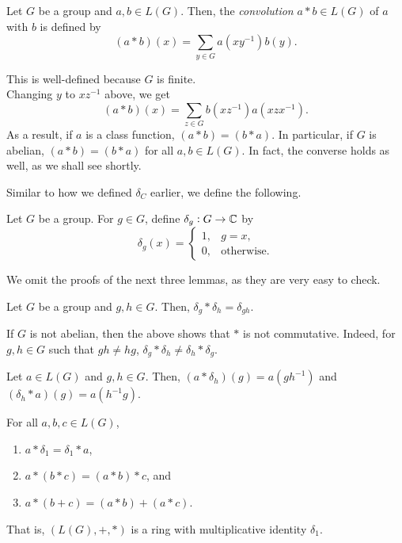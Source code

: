 		\begin{fdef}[Convolution]
			Let $G$ be a group and $a,b \in L(G)$. Then, the \emph{convolution} $a*b \in L(G)$ of $a$ with $b$ is defined by
			\[ (a*b)(x) = \sum_{y \in G} a(xy^{-1}) b(y). \]
		\end{fdef}

		This is well-defined because $G$ is finite.\\

		Changing $y$ to $xz^{-1}$ above, we get
		\[ (a*b)(x) = \sum_{z \in G} b(xz^{-1})a(xzx^{-1}). \]
		As a result, if $a$ is a class function, $(a*b) = (b*a)$. In particular, if $G$ is abelian, $(a*b) = (b*a)$ for all $a,b \in L(G)$. In fact, the converse holds as well, as we shall see shortly.

		Similar to how we defined $\delta_C$ earlier, we define the following.

		\begin{definition}
			Let $G$ be a group. For $g \in G$, define $\delta_g : G \to \mathbb{C}$ by
			\[ \delta_g(x) = \begin{cases} 1, & g = x, \\ 0, & \text{otherwise.} \end{cases} \]
		\end{definition}

		We omit the proofs of the next three lemmas, as they are very easy to check.
		
		\begin{prop}
			Let $G$ be a group and $g,h \in G$. Then, $\delta_g * \delta_h = \delta_{gh}$.
		\end{prop}

		If $G$ is not abelian, then the above shows that $*$ is not commutative. Indeed, for $g,h \in G$ such that $gh \ne hg$, $\delta_g * \delta_h \ne \delta_h * \delta_g$.

		\begin{prop}
			\label{prop: convolution with delta}
			Let $a \in L(G)$ and $g,h \in G$. Then, $(a*\delta_h)(g) = a(gh^{-1})$ and $(\delta_h*a)(g) = a(h^{-1}g)$.
		\end{prop}

		\begin{fprop}
			For all $a,b,c\in L(G)$,
			\begin{enumerate}
				\item $a * \delta_1 = \delta_1 * a$,
				\item $a * (b * c) = (a * b) * c$, and
				\item $a * (b + c) = (a * b) + (a * c)$.
			\end{enumerate}
			That is, $(L(G),+,*)$ is a ring with multiplicative identity $\delta_1$.
		\end{fprop}

